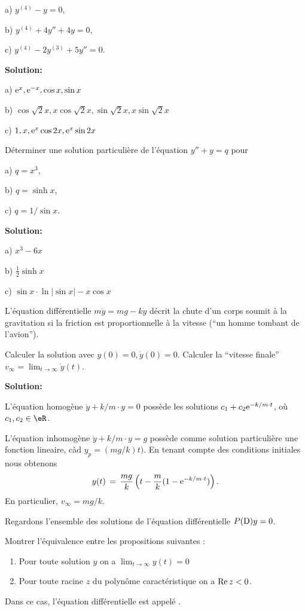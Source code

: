 \medskip
a) $y^{(4)}-y = 0$,

\medskip
b) $y^{(4)} +4y'' +4y = 0$,

\medskip
c) $y^{(4)} -2y^{(3)} +5y'' = 0$.


\bigskip
{\bf Solution:}

\medskip
a) ${\rm e}^x, {\rm e}^{-x}, \cos x, \sin x$

\medskip
b) $\cos \sqrt{2} x, x \cos \sqrt{2}x, \sin \sqrt{2}x, x \sin \sqrt{2}x$

\medskip
c)
$1, x, {\rm e}^x \cos 2x, {\rm e}^x \sin 2x$



\bigskip
\exerNico 
Déterminer une solution particulière de l'équation
$y''+y=q$ pour

\medskip
a) $q = x^3$,

\medskip
b) $q = \sinh x$,

\medskip
c) $q = 1/\sin x$.
 

\bigskip
{\bf Solution:}

\medskip
a) $x^3 - 6 x$

\medskip
b) $\frac 12 \sinh x$

\medskip
c) $\sin x \cdot \ln |\sin x| - x \cos x$


\bigskip
\exerNico  
L'équation différentielle $m \ddot y = mg - k\dot y$ 
décrit la chute d'un corps soumit
à la gravitation si la friction est proportionnelle à la vitesse (``un homme tombant de l'avion'').

\medskip
Calculer la solution avec $y(0) =0, \dot y(0) = 0$.
Calculer la ``vitesse finale'' $v_\infty = \displaystyle \lim_{t \to \infty} \dot y (t)$.



\bigskip
{\bf Solution:}

\medskip
L'équation homogène $\ddot y + k/m \cdot y = 0$
possède les solutions $c_1+c_2 {\rm e}^{-k/m \cdot t}$,
où $c_1, c_2 \in \eR$.
 
L'équation inhomogène $\ddot y + k/m \cdot y = g$
possède comme solution particulière une fonction lineaire, càd 
$y_p = (mg/k)t)$.
En tenant compte des conditions initiales nous obtenons
$$
y(t) \,=\, \frac{mg}{k} \left( t-\frac mk (1-{\rm e}^{-k/m \cdot t})\right).
$$
En particulier, $v_\infty = mg/k$. 

 




\bigskip
\exerNico  
Regardons l'ensemble des solutions de l'équation différentielle $P({\rm D})y =0$.

Montrer l'équivalence entre les propositions suivantes :
\begin{enumerate}

\item
Pour toute solution $y$ on a $\displaystyle \lim_{t \to \infty} y(t) = 0$

\item
Pour toute racine $z$ du polynôme caractéristique on a ${\rm Re}\, z <0$.

\end{enumerate}
Dans ce cas, l'équation différentielle est appelé  .

